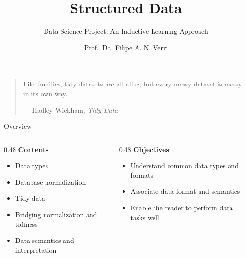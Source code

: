 


\title{Structured Data}
\subtitle{Data Science Project: An Inductive Learning Approach}
\author{Prof.~Dr.~Filipe A. N. Verri}
\date{}



\maketitle
\bookframe


\begin{frame}{}
  \vfill
  \begin{quote}
    Like families, tidy datasets are all alike, but every messy dataset is
    messy in its own way.
    \begin{flushright}
      --- Hadley Wickham, \textit{Tidy Data}
    \end{flushright}
  \end{quote}
  \vfill
\end{frame}


\begin{frame}{Overview}
  \begin{columns}[T]
    \begin{column}{0.48\textwidth}
      \textbf{Contents}
      \begin{itemize}
        \item Data types
        \item Database normalization
        \item Tidy data
        \item Bridging normalization and tidiness
        \item Data semantics and interpretation
      \end{itemize}
    \end{column}
    \begin{column}{0.48\textwidth}
      \textbf{Objectives}
      \begin{itemize}
        \item Understand common data types and formats
        \item Associate data format and semantics
        \item Enable the reader to perform data tasks well
      \end{itemize}
    \end{column}
  \end{columns}
\end{frame}

